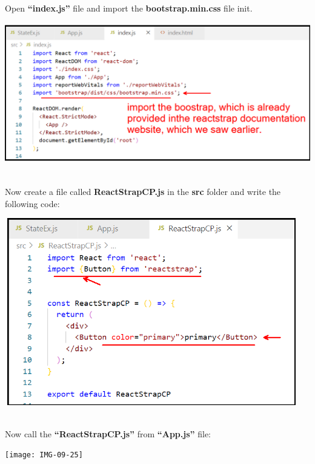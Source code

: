 \documentclass{article}
\begin{document}
\noindent 

\noindent 

\noindent 

\noindent 
\newpage
\noindent 
Open \textbf{``index.js''} file and import the \textbf{bootstrap.min.css} file init.

\begin{center}
	\noindent \includegraphics*[width=5.40in, height=2.40in]{IMG-09-23}
\end{center}

\noindent 

\noindent \\
Now create a file called \textbf{ReactStrapCP.js} in the \textbf{src} folder and write the following code:

\begin{center}
	\noindent \includegraphics*[width=5.04in, height=3.20in]{IMG-09-24}
\end{center}

\noindent 

\noindent \\
Now call the \textbf{``ReactStrapCP.js''} from \textbf{``App.js''} file:

\begin{center}
	\noindent \texttt{[image: IMG-09-25]}
\end{center}
\end{document}
